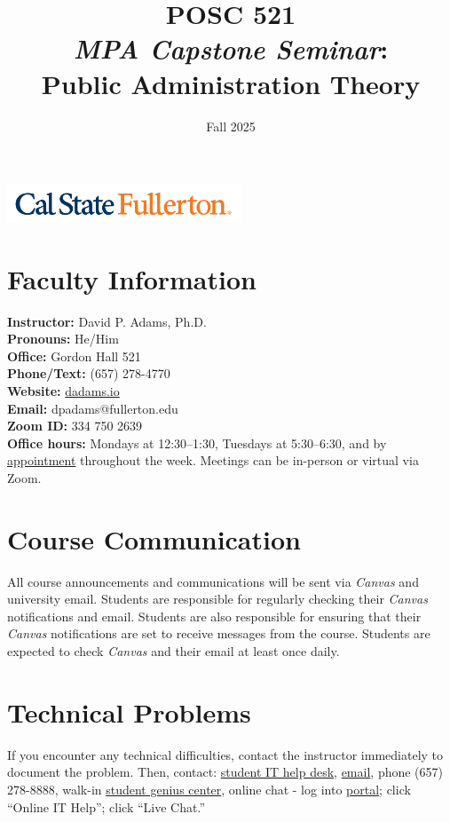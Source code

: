 \documentclass[12pt]{article}     %
\title{\textbf{\Huge{POSC 521}} \\ \textit{MPA Capstone Seminar}: \\
Public Administration Theory} %
\author{}                         %
\date{\Large{Fall 2025}}              %
\begin{document}
\maketitle
\begin{center}
    \includegraphics[width=2.75in, alt={Cal State Fullerton wordmark}]{csuf_logo.png}
\end{center}


\section{Faculty Information}
\noindent \textbf{Instructor:} David P. Adams, Ph.D. \\
\noindent \textbf{Pronouns:} He/Him \\
\noindent \textbf{Office:} Gordon Hall 521 \\
\noindent \textbf{Phone/Text:} (657) 278-4770 \\
\noindent \textbf{Website:} \href{https://dadams.io}{dadams.io} \\
\noindent \textbf{Email:} dpadams@fullerton.edu \\
\noindent \textbf{Zoom ID:} 334 750 2639 \\
\noindent \textbf{Office hours:} Mondays at 12:30--1:30, Tuesdays at 5:30--6:30, and by \href{https://dadams.io/appointments}{appointment} throughout the week. Meetings can be in-person or virtual via Zoom.

\section{Course Communication}
All course announcements and communications will be sent via \emph{Canvas} and university email. Students are responsible for regularly checking their \emph{Canvas} notifications and email. Students are also responsible for ensuring that their \emph{Canvas} notifications are set to receive messages from the course. Students are expected to check \emph{Canvas} and their email at least once daily.

\section{Technical Problems}
If you encounter any technical difficulties, contact the instructor immediately to document the problem. Then, contact: \href{http://www.fullerton.edu/it/students/helpdesk/index.php}{student IT help desk}, \href{mailto:StudentITHelpDesk@fullerton.edu}{email}, phone (657) 278-8888, walk-in \href{http://www.fullerton.edu/it/students/sgc/index.php}{student genius center}, online chat - log into \href{http://my.fullerton.edu}{portal}; click ``Online IT Help''; click ``Live Chat.''
\end{document}
